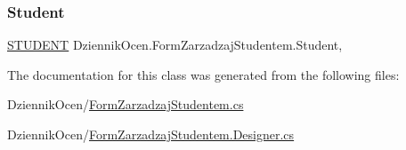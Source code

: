 \subsubsection{\texorpdfstring{Student}{Student}}
{\footnotesize\ttfamily \hyperlink{class_dziennik_ocen_1_1_s_t_u_d_e_n_t}{S\+T\+U\+D\+E\+NT} Dziennik\+Ocen.\+Form\+Zarzadzaj\+Studentem.\+Student\hspace{0.3cm}{\ttfamily [get]}, {\ttfamily [set]}}



The documentation for this class was generated from the following files\+:\begin{DoxyCompactItemize}
\item 
Dziennik\+Ocen/\hyperlink{_form_zarzadzaj_studentem_8cs}{Form\+Zarzadzaj\+Studentem.\+cs}\item 
Dziennik\+Ocen/\hyperlink{_form_zarzadzaj_studentem_8_designer_8cs}{Form\+Zarzadzaj\+Studentem.\+Designer.\+cs}\end{DoxyCompactItemize}
